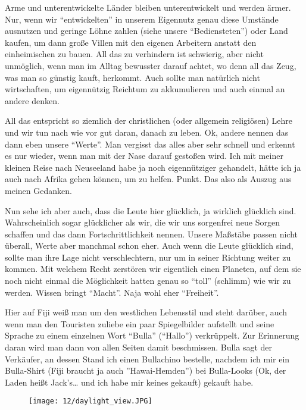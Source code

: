 Arme und unterentwickelte Länder bleiben unterentwickelt und werden
ärmer. Nur, wenn wir ``entwickelten'' in unserem Eigennutz genau diese
Umstände ausnutzen und geringe Löhne zahlen (siehe unsere
``Bediensteten'') oder Land kaufen, um dann große Villen mit den
eigenen Arbeitern anstatt den einheimischen zu bauen. All das zu
verhindern ist schwierig, aber nicht unmöglich, wenn man im Alltag
bewusster darauf achtet, wo denn all das Zeug, was man so günstig
kauft, herkommt. Auch sollte man natürlich nicht wirtschaften, um
eigennützig Reichtum zu akkumulieren und auch einmal an andere denken.

All das entspricht so ziemlich der christlichen (oder allgemein
religiösen) Lehre und wir tun nach wie vor gut daran, danach zu leben.
Ok, andere nennen das dann eben unsere ``Werte''. Man vergisst das
alles aber sehr schnell und erkennt es nur wieder, wenn man mit der
Nase darauf gestoßen wird. Ich mit meiner kleinen Reise nach
Neuseeland habe ja noch eigennütziger gehandelt, hätte ich ja auch
nach Afrika gehen können, um zu helfen. Punkt. Das also als Auszug aus
meinen Gedanken.

Nun sehe ich aber auch, dass die Leute hier glücklich, ja wirklich
glücklich sind. Wahrscheinlich sogar glücklicher als wir, die wir uns
sorgenfrei neue Sorgen schaffen und das dann Fortschrittlichkeit
nennen.  Unsere Maßstäbe passen nicht überall, Werte aber manchmal
schon eher.  Auch wenn die Leute glücklich sind, sollte man ihre Lage
nicht verschlechtern, nur um in seiner Richtung weiter zu kommen. Mit
welchem Recht zerstören wir eigentlich einen Planeten, auf dem sie
noch nicht einmal die Möglichkeit hatten genau so ``toll'' (schlimm)
wie wir zu werden.  Wissen bringt ``Macht''. Naja wohl eher
``Freiheit''.

Hier auf Fiji weiß man um den westlichen Lebensstil und steht darüber,
auch wenn man den Touristen zuliebe ein paar Spiegelbilder aufstellt
und seine Sprache zu einem einzelnen Wort ``Bulla'' (``Hallo'')
verkrüppelt. Zur Erinnerung daran wird man dann von allen Seiten damit
beschmissen. Bulla sagt der Verkäufer, an dessen Stand ich einen
Bullachino bestelle, nachdem ich mir ein Bulla-Shirt (Fiji braucht ja
auch ''Hawai-Hemden'') bei Bulla-Looks (Ok, der Laden heißt
Jack's\ldots{} und ich habe mir keines gekauft) gekauft habe.
\begin{figure}[h]
  \centering
  \texttt{[image: 12/daylight\_view.JPG]}
\end{figure}

